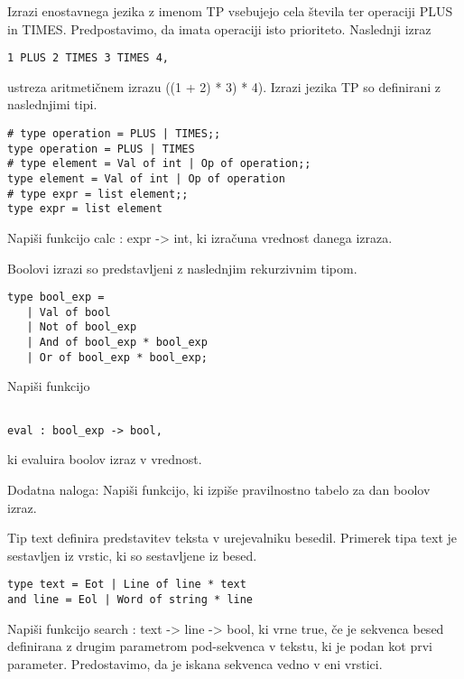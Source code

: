 \begin{ex}
Izrazi enostavnega jezika z imenom TP vsebujejo cela \v stevila ter operaciji PLUS in TIMES. Predpostavimo, da imata operaciji isto prioriteto. Naslednji izraz
\begin{lstlisting}
1 PLUS 2 TIMES 3 TIMES 4,
\end{lstlisting}
ustreza aritmeti\v cnem izrazu ((1 + 2) * 3) * 4). Izrazi jezika TP so definirani z naslednjimi tipi. 
 
\begin{lstlisting}
# type operation = PLUS | TIMES;; 
type operation = PLUS | TIMES 
# type element = Val of int | Op of operation;; 
type element = Val of int | Op of operation
# type expr = list element;;
type expr = list element

\end{lstlisting}
Napi\v si funkcijo calc : expr -> int, ki izra\v cuna vrednost danega izraza.  
\end{ex} 





\begin{ex}
Boolovi izrazi so predstavljeni z naslednjim rekurzivnim tipom.   

\begin{lstlisting}
type bool_exp =
   | Val of bool
   | Not of bool_exp
   | And of bool_exp * bool_exp
   | Or of bool_exp * bool_exp;

\end{lstlisting}
Napi\v si funkcijo
\begin{lstlisting}

eval : bool_exp -> bool, 
\end{lstlisting}

ki evaluira boolov izraz v vrednost.   

Dodatna naloga: Napi\v si funkcijo, ki izpi\v se pravilnostno tabelo za dan boolov izraz.
\end{ex} 




\begin{ex}
Tip text definira predstavitev teksta v urejevalniku besedil. Primerek tipa text je sestavljen iz vrstic, ki so sestavljene iz besed.

\begin{lstlisting}
type text = Eot | Line of line * text
and line = Eol | Word of string * line
\end{lstlisting}

Napi\v si funkcijo search : text -> line -> bool, ki vrne true, \v ce je sekvenca besed definirana z drugim parametrom pod-sekvenca v tekstu, ki je podan kot prvi parameter. Predostavimo, da je iskana sekvenca vedno v eni vrstici.
\end{ex} 






